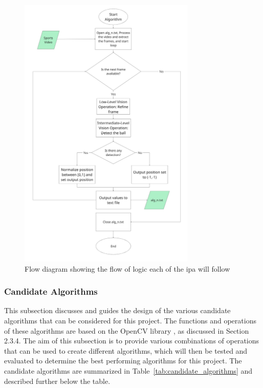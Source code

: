 \documentclass[12pt,a4paper]{article}
\begin{document}
\begin{figure}[H]
	\centering
	\includegraphics[width=0.75\textwidth]{ipa_flow.jpg}
	\caption{Flow diagram showing the flow of logic each of the \acs{ipa} will follow}
	\label{fig:ipaflow}
\end{figure}

\subsubsection{Candidate Algorithms}
This subsection discusses and guides the design of the various candidate algorithms that can be considered for this project. The functions and operations of these algorithms are based on the OpenCV library \parencite{opencv_library}, as discussed in Section 2.3.4. The aim of this subsection is to provide various combinations of operations that can be used to create different algorithms, which will then be tested and evaluated to determine the best performing algorithms for this project. The candidate algorithms are summarized in Table~\ref{tab:candidate_algorithms} and described further below the table.
\end{document}
